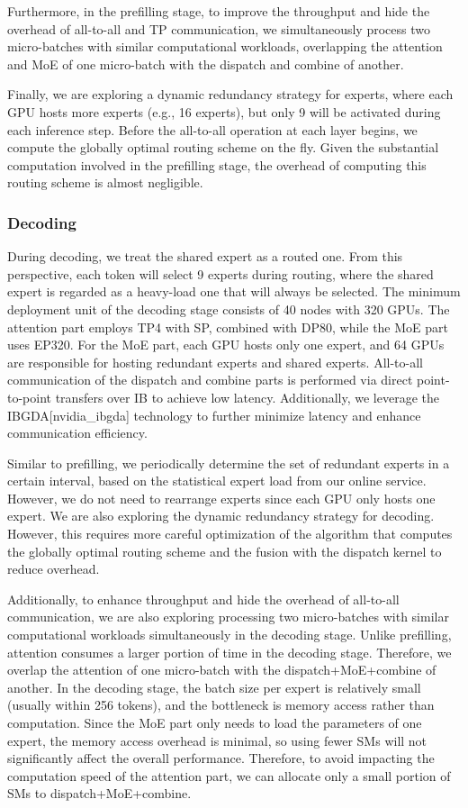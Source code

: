 \documentclass[11pt,a4paper]{article}
\begin{document}
Furthermore, in the prefilling stage, to improve the throughput and hide the overhead of all-to-all and TP communication, we simultaneously process two micro-batches with similar computational workloads, overlapping the attention and MoE of one micro-batch with the dispatch and combine of another.

Finally, we are exploring a dynamic redundancy strategy for experts, where each GPU hosts more experts (e.g., 16 experts), but only 9 will be activated during each inference step. Before the all-to-all operation at each layer begins, we compute the globally optimal routing scheme on the fly. Given the substantial computation involved in the prefilling stage, the overhead of computing this routing scheme is almost negligible.

\subsubsection{Decoding}

During decoding, we treat the shared expert as a routed one. From this perspective, each token will select 9 experts during routing, where the shared expert is regarded as a heavy-load one that will always be selected. The minimum deployment unit of the decoding stage consists of 40 nodes with 320 GPUs. The attention part employs TP4 with SP, combined with DP80, while the MoE part uses EP320. For the MoE part, each GPU hosts only one expert, and 64 GPUs are responsible for hosting redundant experts and shared experts. All-to-all communication of the dispatch and combine parts is performed via direct point-to-point transfers over IB to achieve low latency. Additionally, we leverage the IBGDA[nvidia\_ibgda] technology to further minimize latency and enhance communication efficiency.

Similar to prefilling, we periodically determine the set of redundant experts in a certain interval, based on the statistical expert load from our online service. However, we do not need to rearrange experts since each GPU only hosts one expert. We are also exploring the dynamic redundancy strategy for decoding. However, this requires more careful optimization of the algorithm that computes the globally optimal routing scheme and the fusion with the dispatch kernel to reduce overhead.

Additionally, to enhance throughput and hide the overhead of all-to-all communication, we are also exploring processing two micro-batches with similar computational workloads simultaneously in the decoding stage. Unlike prefilling, attention consumes a larger portion of time in the decoding stage. Therefore, we overlap the attention of one micro-batch with the dispatch+MoE+combine of another. In the decoding stage, the batch size per expert is relatively small (usually within 256 tokens), and the bottleneck is memory access rather than computation. Since the MoE part only needs to load the parameters of one expert, the memory access overhead is minimal, so using fewer SMs will not significantly affect the overall performance. Therefore, to avoid impacting the computation speed of the attention part, we can allocate only a small portion of SMs to dispatch+MoE+combine.
\end{document}
